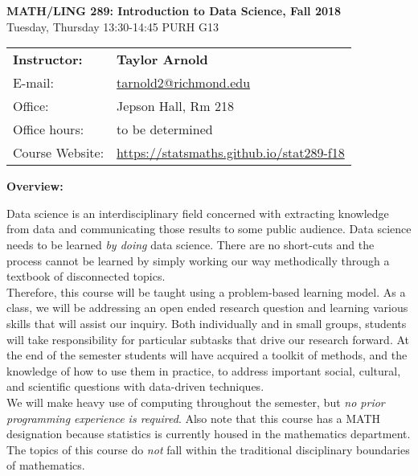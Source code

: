 \documentclass[12pt]{article}
\begin{document}
\begin{center}
{\bf MATH/LING 289: Introduction to Data Science, Fall 2018} \\
Tuesday, Thursday 13:30-14:45 \quad PURH G13\\
\end{center}

\bigskip

\noindent
\begin{tabular}{ l l }
{\bf Instructor:} &  {\bf Taylor Arnold} \\
E-mail: & \href{mailto:tarnold2@richmond.edu}{tarnold2@richmond.edu} \\
Office: & Jepson Hall, Rm 218 \\
Office hours: & to be determined \\
Course Website: & \url{https://statsmaths.github.io/stat289-f18}
\end{tabular}

\vspace{0.5cm}

\textbf{Overview:} \vspace{6pt}

Data science is an interdisciplinary field concerned with extracting knowledge
from data and communicating those results to some public audience. Data
science needs to be learned \textit{by doing} data science. There are
no short-cuts and the process cannot be learned by simply working our way
methodically through a textbook of disconnected topics.\\

Therefore, this course will be taught using a problem-based learning model. As
a class, we will be addressing an open ended research question and learning
various skills that will assist our inquiry. Both individually and in small
groups, students will take responsibility for particular subtasks that drive
our research forward. At the end of the semester students will have acquired
a toolkit of methods, and the knowledge of how to use them in practice, to
address important social, cultural, and scientific questions with data-driven
techniques.\\

We will make heavy use of computing throughout the semester, but \textit{no
prior programming experience is required}. Also note that this course has a
MATH designation because statistics is currently housed in the mathematics
department. The topics of this course do \textit{not} fall within the
traditional disciplinary boundaries of mathematics.\\
\end{document}
